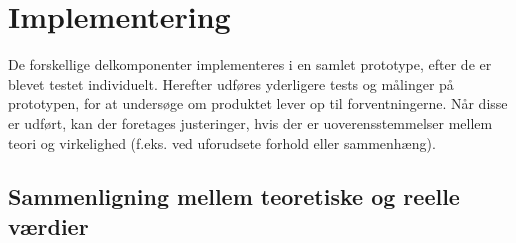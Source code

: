 \documentclass[../main.tex]{subfiles}
\begin{document}
\chapter{Implementering } \label{Chap:Implementering}
De forskellige delkomponenter implementeres i en samlet prototype, efter de er blevet testet individuelt. Herefter udføres yderligere tests og målinger på prototypen, for at undersøge om produktet lever op til forventningerne. Når disse er udført, kan der foretages justeringer, hvis der er uoverensstemmelser mellem teori og virkelighed (f.eks. ved uforudsete forhold eller sammenhæng).

\section{Sammenligning mellem teoretiske og reelle værdier}
\end{document}
